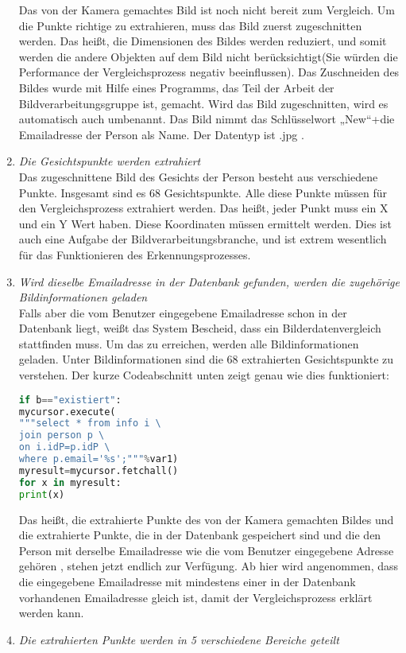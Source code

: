 \begin{enumerate}
Das von der Kamera gemachtes Bild ist noch nicht bereit zum Vergleich. Um die Punkte richtige zu extrahieren, muss das Bild zuerst zugeschnitten werden. Das heißt, die Dimensionen des Bildes werden reduziert, und somit werden die andere Objekten auf dem Bild nicht berücksichtigt(Sie würden die Performance der Vergleichsprozess negativ beeinflussen). Das Zuschneiden des Bildes wurde mit Hilfe eines Programms, das Teil der Arbeit der Bildverarbeitungsgruppe ist, gemacht. Wird das Bild zugeschnitten, wird es automatisch auch umbenannt. Das Bild nimmt das Schlüsselwort „New“+die Emailadresse der Person als Name. Der Datentyp ist .jpg .
	\item \textit{Die Gesichtspunkte werden extrahiert} \\
	
Das zugeschnittene Bild des Gesichts der Person besteht aus verschiedene Punkte. Insgesamt sind es 68 Gesichtspunkte. Alle diese Punkte müssen für den Vergleichsprozess extrahiert werden. Das heißt, jeder Punkt muss ein X und ein Y Wert haben. Diese Koordinaten müssen ermittelt werden. Dies ist auch eine Aufgabe der Bildverarbeitungsbranche, und ist extrem wesentlich für das Funktionieren des Erkennungsprozesses.
	\item \textit{Wird dieselbe Emailadresse in der Datenbank gefunden, werden die zugehörige Bildinformationen geladen} \\
	
	Falls aber die vom Benutzer eingegebene Emailadresse schon in der Datenbank liegt, weißt das System Bescheid, dass ein Bilderdatenvergleich stattfinden muss. Um das zu erreichen, werden alle Bildinformationen geladen. Unter Bildinformationen sind die 68 extrahierten Gesichtspunkte zu verstehen. Der kurze Codeabschnitt unten zeigt genau wie dies funktioniert: \\
	
\begin{lstlisting}[language=Python]
if b=="existiert":
mycursor.execute(
"""select * from info i \
join person p \
on i.idP=p.idP \
where p.email='%s';"""%var1)
myresult=mycursor.fetchall()
for x in myresult:
print(x)
\end{lstlisting}
	
	Das heißt, die extrahierte Punkte des von der Kamera gemachten Bildes und die extrahierte Punkte, die in der Datenbank gespeichert sind und die den Person mit derselbe Emailadresse wie die vom Benutzer eingegebene Adresse gehören , stehen jetzt endlich zur Verfügung. Ab hier wird angenommen, dass die eingegebene Emailadresse mit mindestens einer in der Datenbank vorhandenen Emailadresse gleich ist, damit der Vergleichsprozess erklärt werden kann.
	\item \textit{Die extrahierten Punkte werden in 5 verschiedene Bereiche geteilt} \\
	

\end{enumerate}
